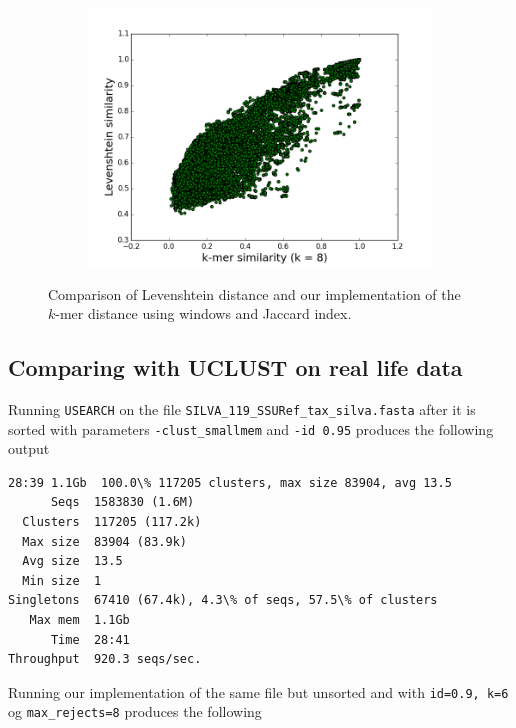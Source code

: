 \begin{figure}
  \centering
  \begin{subfigure}[b]{0.5\textwidth}
    \includegraphics[scale=0.34]{graphics/k8.png}
  \end{subfigure}
  \caption{Comparison of Levenshtein distance and our implementation of the
  $k$-mer distance using windows and Jaccard index.}
  \label{fig:Levenshtein_vs_Kmer}
\end{figure}


\subsection{Comparing with UCLUST on real life data}
Running \texttt{USEARCH} on the file
\texttt{SILVA\_119\_SSURef\_tax\_silva.fasta} after it is sorted with
parameters \texttt{-clust\_smallmem} and \texttt{-id 0.95} produces the
following output

\begin{lstlisting}[style=output-style,
  caption=Output from \texttt{USEARCH} clustering.,
  label=fig:uclust_silva]
28:39 1.1Gb  100.0\% 117205 clusters, max size 83904, avg 13.5
      Seqs  1583830 (1.6M)
  Clusters  117205 (117.2k)
  Max size  83904 (83.9k)
  Avg size  13.5
  Min size  1
Singletons  67410 (67.4k), 4.3\% of seqs, 57.5\% of clusters
   Max mem  1.1Gb
      Time  28:41
Throughput  920.3 seqs/sec.
\end{lstlisting}

Running our implementation of the same file but unsorted and with
\texttt{id=0.9, k=6} og \texttt{max\_rejects=8} produces the following

